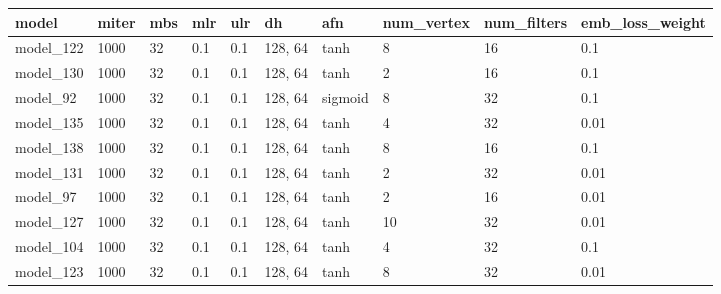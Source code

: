 \begin{tabular}{|l|l|l|l|l|l|l|l|l|l|}
\hline
\textbf{model} & \textbf{miter} & \textbf{mbs} & \textbf{mlr} & \textbf{ulr} & \textbf{dh} & \textbf{afn} & \textbf{num\_vertex} & \textbf{num\_filters} & \textbf{emb\_loss\_weight} \\ \hline
model\_122     & 1000           & 32           & 0.1          & 0.1          & 128, 64     & tanh         & 8                    & 16                    & 0.1                        \\ \hline
model\_130     & 1000           & 32           & 0.1          & 0.1          & 128, 64     & tanh         & 2                    & 16                    & 0.1                        \\ \hline
model\_92      & 1000           & 32           & 0.1          & 0.1          & 128, 64     & sigmoid      & 8                    & 32                    & 0.1                        \\ \hline
model\_135     & 1000           & 32           & 0.1          & 0.1          & 128, 64     & tanh         & 4                    & 32                    & 0.01                       \\ \hline
model\_138     & 1000           & 32           & 0.1          & 0.1          & 128, 64     & tanh         & 8                    & 16                    & 0.1                        \\ \hline
model\_131     & 1000           & 32           & 0.1          & 0.1          & 128, 64     & tanh         & 2                    & 32                    & 0.01                       \\ \hline
model\_97      & 1000           & 32           & 0.1          & 0.1          & 128, 64     & tanh         & 2                    & 16                    & 0.01                       \\ \hline
model\_127     & 1000           & 32           & 0.1          & 0.1          & 128, 64     & tanh         & 10                   & 32                    & 0.01                       \\ \hline
model\_104     & 1000           & 32           & 0.1          & 0.1          & 128, 64     & tanh         & 4                    & 32                    & 0.1                        \\ \hline
model\_123     & 1000           & 32           & 0.1          & 0.1          & 128, 64     & tanh         & 8                    & 32                    & 0.01                       \\ \hline

\end{tabular}
